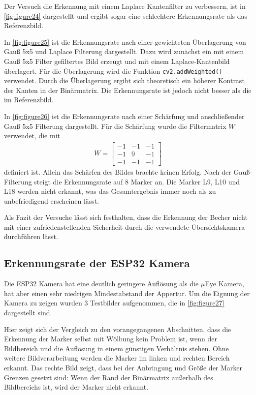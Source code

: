     Der Versuch die Erkennung mit einem Laplace Kantenfilter zu verbessern, ist in \ref{fig:figure24} dargestellt und ergibt sogar eine schlechtere Erkennungsrate als das Referenzbild.
    
    In \ref{fig:figure25} ist die Erkennungsrate nach einer gewichteten Überlagerung von Gauß 5x5 und Laplace Filterung dargestellt. 
    Dazu wird zunächst ein mit einem Gauß 5x5 Filter gefiltertes Bild erzeugt und mit einem Laplace-Kantenbild überlagert. 
    Für die Überlagerung wird die Funktion \verb|cv2.addWeighted()| verwendet. 
    Durch die Überlagerung ergibt sich theoretisch ein höherer Kontrast der Kanten in der Binärmatrix. 
    Die Erkennungsrate ist jedoch nicht besser als die im Referenzbild.

    In \ref{fig:figure26} ist die Erkennungsrate nach einer Schärfung und anschließender Gauß 5x5 Filterung dargestellt.
    Für die Schärfung wurde die Filtermatrix $W$ verwendet, die mit 
    \begin{align*}
        W = \begin{bmatrix}
            -1 & -1 & -1 \\
            -1 & 9 & -1 \\
            -1 & -1 & -1
        \end{bmatrix}
    \end{align*}
    definiert ist. Allein das Schärfen des Bildes brachte keinen Erfolg. Nach der Gauß-Filterung steigt die Erkennungsrate auf 8 Marker an. 
    Die Marker L9, L10 und L18 werden nicht erkannt, was das Gesamtergebnis immer noch als zu unbefriedigend erscheinen lässt.

    Als Fazit der Versuche lässt sich festhalten, dass die Erkennung der Becher nicht mit einer zufriedenstellenden Sicherheit durch die verwendete Übersichtskamera durchführen lässt. 

    \subsection{Erkennungsrate der ESP32 Kamera}\label{ErkennungsrateESP32}

    Die ESP32 Kamera hat eine deutlich geringere Auflösung als die $\mu$Eye Kamera, hat aber einen sehr niedrigen Mindestabstand der Appertur.
    Um die Eignung der Kamera zu zeigen wurden 3 Testbilder aufgenommen, die in \ref{fig:figure27} dargestellt sind.

    Hier zeigt sich der Vergleich zu den vorangegangenen Abschnitten, dass die Erkennung der Marker selbst mit Wölbung kein Problem ist, wenn der Bildbereich und die Auflösung in einem günstigen Verhältnis stehen.
    Ohne weitere Bildverarbeitung werden die Marker im linken und rechten Bereich erkannt. 
    Das rechte Bild zeigt, dass bei der Anbringung und Größe der Marker Grenzen gesetzt sind: 
    Wenn der Rand der Binärmatrix außerhalb des Bildbereichs ist, wird der Marker nicht erkannt.

